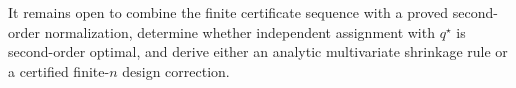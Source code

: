 It remains open to combine the finite certificate sequence with a proved second-order normalization, determine whether independent assignment with \(q^\star\) is second-order optimal, and derive either an analytic multivariate shrinkage rule or a certified finite-\(n\) design correction.